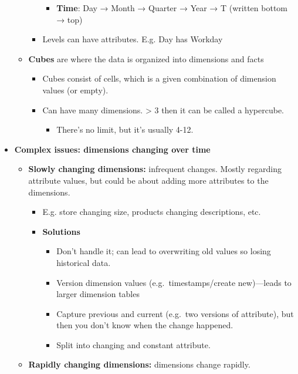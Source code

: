 \begin{multicols}{2}
\begin{itemize}
\begin{itemize}
\begin{itemize}
      \begin{itemize}
            \item
        \textbf{Time}: Day → Month → Quarter → Year → T \textbar{}
        (written bottom → top)
      \end{itemize}
    \item
      Levels can have attributes. E.g. Day has Workday
    \end{itemize}
  \item
    \textbf{Cubes} are where the data is organized into dimensions and
    facts

    \begin{itemize}
        \item
      Cubes consist of cells, which is a given combination of dimension
      values (or empty).
    \item
      Can have many dimensions. \textgreater{} 3 then it can be called a
      hypercube.

      \begin{itemize}
            \item
        There's no limit, but it's usually 4-12.
      \end{itemize}
    \end{itemize}
  \end{itemize}
\item
  \textbf{Complex issues: dimensions changing over time}

  \begin{itemize}
    \item
    \textbf{Slowly changing dimensions:} infrequent changes. Mostly
    regarding attribute values, but could be about adding more
    attributes to the dimensions.

    \begin{itemize}
        \item
      E.g. store changing size, products changing descriptions, etc.
    \item
      \textbf{Solutions}

      \begin{itemize}
            \item
        Don't handle it; can lead to overwriting old values so losing
        historical data.
      \item
        Version dimension values (e.g.~timestamps/create new)---leads to
        larger dimension tables
      \item
        Capture previous and current (e.g.~two versions of attribute),
        but then you don't know when the change happened.
      \item
        Split into changing and constant attribute.
      \end{itemize}
    \end{itemize}
  \item
    \textbf{Rapidly changing dimensions:} dimensions change rapidly.


\end{itemize}
\end{itemize}
\end{multicols}
